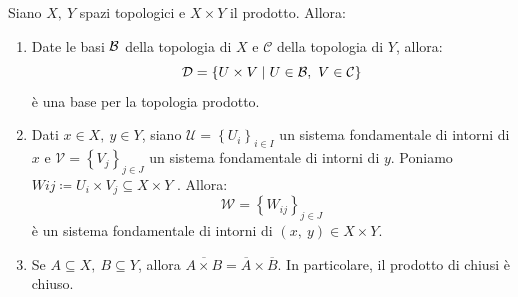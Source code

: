 \begin{proposition}
Siano $X,\ Y$ spazi topologici e $X\times Y$ il prodotto. Allora:
\begin{enumerate}
\item Date le basi $\mathcal{B}$ della topologia di $X$ e $\mathcal{C}$ della topologia di $Y$, allora:
\begin{equation}
\mathcal{D}=\left\{U\times V\mid U\in\mathcal{B},\ V\in\mathcal{C}\right\}
\end{equation}
è una base per la topologia prodotto.
\item Dati $x\in X,\ y\in Y$, siano $\mathcal{U} = \left\{U_i\right\}_{i\in I}$ un
sistema fondamentale di intorni di $x$ e $\mathcal{V} = \left\{V_j\right\}_{j\in J}$ un sistema fondamentale di intorni di $y$. Poniamo $Wij \coloneqq U_i \times V_j \subseteq X \times Y$ . Allora:
\begin{equation}
\mathcal{W} = \left\{W_{ij}\right\}_{j\in J}
\end{equation}
è un sistema fondamentale di intorni di $\left(x,\ y\right) \in X \times Y$.
\item Se $A\subseteq X,\ B\subseteq Y$, allora $\overline{A\times B}=\overline{A}\times \overline{B}$. In particolare, il prodotto di chiusi è chiuso.
\end{enumerate}
\end{proposition}
